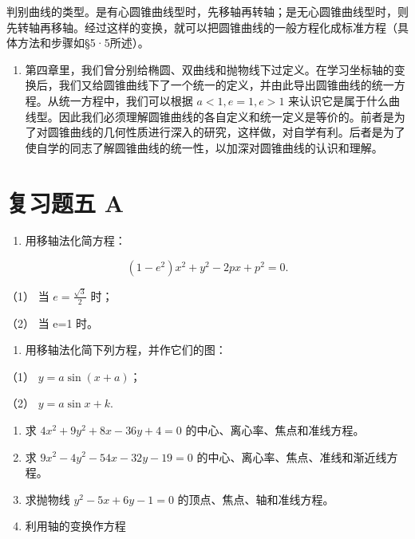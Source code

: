 判别曲线的类型。是有心圆锥曲线型时，先移轴再转轴；是无心圆锥曲线型时，则先转轴再移轴。经过这样的变换，就可以把圆锥曲线的一般方程化成标准方程（具体方法和步骤如§5·5所述）。

\begin{enumerate}
\def\labelenumi{\arabic{enumi}.}
\setcounter{enumi}{1}
\tightlist
\item
  第四章里，我们曾分别给椭圆、双曲线和抛物线下过定义。在学习坐标轴的变换后，我们又给圆锥曲线下了一个统一的定义，并由此导出圆锥曲线的统一方程。从统一方程中，我们可以根据
  \(a < 1, e = 1, e > 1\)
  来认识它是属于什么曲线型。因此我们必须理解圆锥曲线的各自定义和统一定义是等价的。前者是为了对圆锥曲线的几何性质进行深入的研究，这样做，对自学有利。后者是为了使自学的同志了解圆锥曲线的统一性，以加深对圆锥曲线的认识和理解。
\end{enumerate}

\section{复习题五 A}\label{ux590dux4e60ux9898ux4e94-a}

\begin{enumerate}
\def\labelenumi{\arabic{enumi}.}
\tightlist
\item
  用移轴法化简方程：
\end{enumerate}

\[
(1 - e^{2}) x^{2} + y^{2} - 2 p x + p^{2} = 0.
\]

（1） 当 \(e=\frac{\sqrt{3}}{2}\) 时；

（2） 当 e=1 时。

\begin{enumerate}
\def\labelenumi{\arabic{enumi}.}
\setcounter{enumi}{1}
\tightlist
\item
  用移轴法化简下列方程，并作它们的图：
\end{enumerate}

（1） \(y = a \sin (x + a)\)；

（2） \(y = a \sin x + k.\)

\begin{enumerate}
\def\labelenumi{\arabic{enumi}.}
\setcounter{enumi}{2}
\item
  求 \(4x^{2} + 9y^{2} + 8x - 36y + 4 = 0\)
  的中心、离心率、焦点和准线方程。
\item
  求 \(9x^{2} - 4y^{2} - 54x - 32y - 19 = 0\)
  的中心、离心率、焦点、准线和渐近线方程。
\item
  求抛物线 \(y^{2} - 5x + 6y - 1 = 0\) 的顶点、焦点、轴和准线方程。
\item
  利用轴的变换作方程
\end{enumerate}

